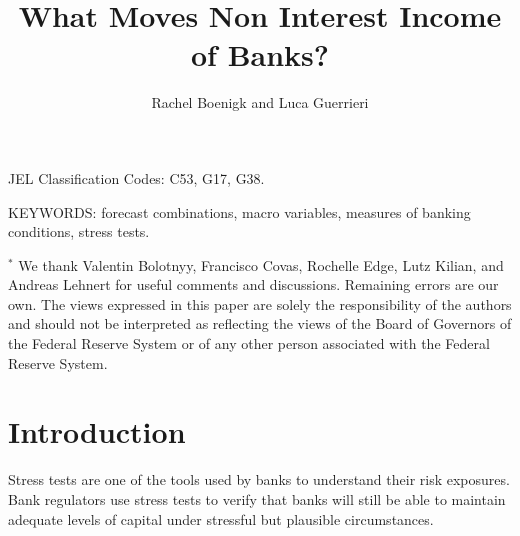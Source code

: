 \documentclass[12pt]{article}
\renewcommand{\baselinestretch}{1.5}
\begin{document}
\thispagestyle{empty} \normalsize


\title{What Moves Non Interest Income of Banks?}
\author{Rachel Boenigk and Luca Guerrieri} \maketitle

\renewcommand{\baselinestretch}{1} \normalsize


\vspace{1cm}

\noindent JEL Classification Codes: C53, G17, G38.

\noindent KEYWORDS: forecast combinations, macro variables,
measures of banking conditions, stress tests.

\vspace{1cm}

\noindent \footnotesize $^*$ We thank Valentin Bolotnyy, Francisco
Covas, Rochelle Edge, Lutz Kilian, and Andreas Lehnert for useful
comments and discussions. Remaining errors are our own. The views
expressed in this paper are solely the responsibility of the
authors and should not be interpreted as reflecting the views of
the Board of Governors of the Federal Reserve System or of any
other person associated with the Federal Reserve System.
\vspace{0.5cm}


\clearpage \renewcommand{\baselinestretch}{1.5} \normalsize

\section{Introduction}

Stress tests are one of the tools used by banks to understand
their risk exposures. Bank regulators use stress tests to verify
that banks will still be able to maintain adequate levels of
capital under stressful but plausible circumstances.
\end{document}

